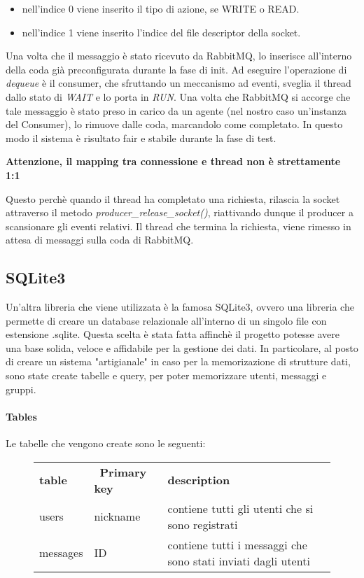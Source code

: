 \documentclass[]{article}
\begin{document}
\begin{itemize}
	\item nell'indice 0 viene inserito il tipo di azione, se WRITE o READ.
	\item nell'indice 1 viene inserito l'indice del file descriptor della socket.
\end{itemize}
Una volta che il messaggio \`e stato ricevuto da RabbitMQ, lo inserisce all'interno della coda
gi\`a preconfigurata durante la fase di init.
Ad eseguire l'operazione di \textit{dequeue} \`e il consumer, che sfruttando un meccanismo
ad eventi, sveglia il thread dallo stato di \textit{WAIT} e lo porta in \textit{RUN}.
Una volta che RabbitMQ si accorge che tale messaggio \`e  stato preso in carico da un agente (nel nostro caso un'instanza del Consumer),
lo rimuove dalle coda, marcandolo come completato.
In questo modo il sistema \`e risultato fair e stabile durante la fase di test.

\begin{center}
\textbf{	Attenzione, il mapping tra connessione e thread non \`e strettamente 1:1}
\end{center}

Questo perch\`e quando il thread ha completato una richiesta, rilascia la socket attraverso il metodo \textit{producer\_release\_socket()}, riattivando dunque il producer a scansionare gli eventi relativi. Il thread che termina la richiesta, viene rimesso in attesa di messaggi
sulla coda di RabbitMQ.

\subsection{SQLite3}
Un'altra libreria che viene utilizzata \`e la famosa SQLite3, ovvero una libreria che permette di creare un database relazionale
all'interno di un singolo file con estensione .sqlite.
Questa scelta \`e stata fatta affinch\`e il progetto potesse avere una base solida, veloce e affidabile per la gestione dei dati.
In particolare, al posto di creare un sistema "artigianale" in caso per la memorizazione di strutture dati, sono state create
tabelle e query, per poter memorizzare utenti, messaggi e gruppi.

\paragraph{Tables}
Le tabelle che vengono create sono le seguenti:

\begin{figure}[H]
	\begin{table}[H]
		\begin{tabular}{lll}			
			\textbf{table} & \ \textbf{Primary key} & \textbf{description} \\
			users & nickname & contiene tutti gli utenti che si sono registrati \\
			messages & ID & contiene tutti i messaggi che sono stati inviati dagli utenti
		\end{tabular}
	\end{table}
\end{figure}
\end{document}
